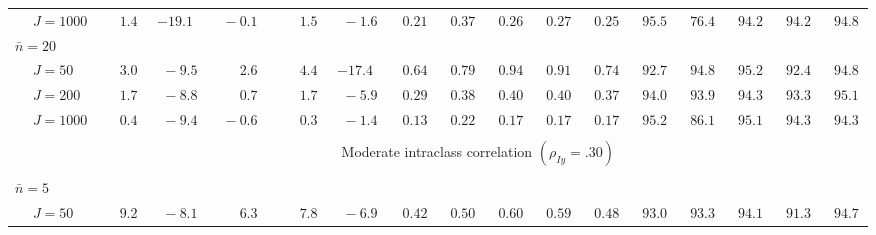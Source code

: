 \begin{sidewaystable}
\begin{threeparttable}
\begin{tabular}{llccccccccccccccc}
 & \nopagebreak $\;J=1000$  & $\phantom{0}\phantom{-}1.4\phantom{0}$ & ${-}19.1\phantom{0}$ & $\phantom{0}{-}0.1\phantom{0}$ & $\phantom{0}\phantom{-}1.5\phantom{0}$ & $\phantom{0}{-}1.6\phantom{0}$ & $\phantom{0}0.21\phantom{0}$ & $\phantom{0}0.37\phantom{0}$ & $\phantom{0}0.26\phantom{0}$ & $\phantom{0}0.27\phantom{0}$ & $\phantom{0}0.25\phantom{0}$ & $\phantom{0}95.5\phantom{0}$ & $\phantom{0}76.4\phantom{0}$ & $\phantom{0}94.2\phantom{0}$ & $\phantom{0}94.2\phantom{0}$ & $\phantom{0}94.8\phantom{0}$ \\
\multicolumn{4}{l}{$\bar{n}=20$} \\  & \nopagebreak $\;J=50$  & $\phantom{0}\phantom{-}3.0\phantom{0}$ & $\phantom{0}{-}9.5\phantom{0}$ & $\phantom{0}\phantom{-}2.6\phantom{0}$ & $\phantom{0}\phantom{-}4.4\phantom{0}$ & ${-}17.4\phantom{0}$ & $\phantom{0}0.64\phantom{0}$ & $\phantom{0}0.79\phantom{0}$ & $\phantom{0}0.94\phantom{0}$ & $\phantom{0}0.91\phantom{0}$ & $\phantom{0}0.74\phantom{0}$ & $\phantom{0}92.7\phantom{0}$ & $\phantom{0}94.8\phantom{0}$ & $\phantom{0}95.2\phantom{0}$ & $\phantom{0}92.4\phantom{0}$ & $\phantom{0}94.8\phantom{0}$ \\
 & \nopagebreak $\;J=200$  & $\phantom{0}\phantom{-}1.7\phantom{0}$ & $\phantom{0}{-}8.8\phantom{0}$ & $\phantom{0}\phantom{-}0.7\phantom{0}$ & $\phantom{0}\phantom{-}1.7\phantom{0}$ & $\phantom{0}{-}5.9\phantom{0}$ & $\phantom{0}0.29\phantom{0}$ & $\phantom{0}0.38\phantom{0}$ & $\phantom{0}0.40\phantom{0}$ & $\phantom{0}0.40\phantom{0}$ & $\phantom{0}0.37\phantom{0}$ & $\phantom{0}94.0\phantom{0}$ & $\phantom{0}93.9\phantom{0}$ & $\phantom{0}94.3\phantom{0}$ & $\phantom{0}93.3\phantom{0}$ & $\phantom{0}95.1\phantom{0}$ \\
 & \nopagebreak $\;J=1000$  & $\phantom{0}\phantom{-}0.4\phantom{0}$ & $\phantom{0}{-}9.4\phantom{0}$ & $\phantom{0}{-}0.6\phantom{0}$ & $\phantom{0}\phantom{-}0.3\phantom{0}$ & $\phantom{0}{-}1.4\phantom{0}$ & $\phantom{0}0.13\phantom{0}$ & $\phantom{0}0.22\phantom{0}$ & $\phantom{0}0.17\phantom{0}$ & $\phantom{0}0.17\phantom{0}$ & $\phantom{0}0.17\phantom{0}$ & $\phantom{0}95.2\phantom{0}$ & $\phantom{0}86.1\phantom{0}$ & $\phantom{0}95.1\phantom{0}$ & $\phantom{0}94.3\phantom{0}$ & $\phantom{0}94.3\phantom{0}$ \\
[0.5ex]\hline\\[-1.6ex] 
& & \multicolumn{15}{c}{Moderate intraclass correlation $(\rho_{Iy}=.30)$} \\[0.6ex]\hline\\[-1.8ex]
\multicolumn{4}{l}{$\bar{n}=5$} \\  & \nopagebreak $\;J=50$  & $\phantom{0}\phantom{-}9.2\phantom{0}$ & $\phantom{0}{-}8.1\phantom{0}$ & $\phantom{0}\phantom{-}6.3\phantom{0}$ & $\phantom{0}\phantom{-}7.8\phantom{0}$ & $\phantom{0}{-}6.9\phantom{0}$ & $\phantom{0}0.42\phantom{0}$ & $\phantom{0}0.50\phantom{0}$ & $\phantom{0}0.60\phantom{0}$ & $\phantom{0}0.59\phantom{0}$ & $\phantom{0}0.48\phantom{0}$ & $\phantom{0}93.0\phantom{0}$ & $\phantom{0}93.3\phantom{0}$ & $\phantom{0}94.1\phantom{0}$ & $\phantom{0}91.3\phantom{0}$ & $\phantom{0}94.7\phantom{0}$ \\

\end{tabular}
\end{threeparttable}
\end{sidewaystable}
